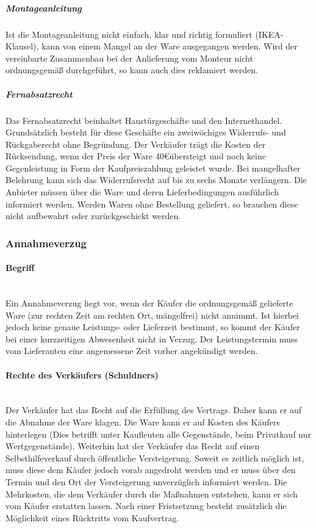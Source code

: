 \subparagraph{Montageanleitung} Ist die Montageanleitung nicht einfach, klar und richtig formuliert (IKEA-Klausel), kann von einem Mangel an der Ware ausgegangen werden. Wird der vereinbarte Zusammenbau bei der Anlieferung vom Monteur nicht ordnungsgemäß durchgeführt, so kann auch dies reklamiert werden.

\subparagraph{Fernabsatzrecht} Das Fernabsatzrecht beinhaltet Haustürgeschäfte und den Internethandel. Grundsätzlich besteht für diese Geschäfte ein zweiwöchiges Widerrufs- und Rückgaberecht ohne Begründung. Der Verkäufer trägt die Kosten der Rücksendung, wenn der Preis der Ware 40\euro übersteigt und noch keine Gegenleistung in Form der Kaufpreiszahlung geleistet wurde. Bei mangelhafter Belehrung kann sich das Widerrufsrecht auf bis zu sechs Monate verlängern. Die Anbieter müssen über die Ware und deren Lieferbedingungen ausführlich informiert werden. Werden Waren ohne Bestellung geliefert, so brauchen diese nicht aufbewahrt oder zurückgeschickt werden. 
		
		
\subsubsection{Annahmeverzug}

\paragraph{Begriff}~\\
Ein Annahmeverzug liegt vor, wenn der Käufer die ordnungsgemäß gelieferte Ware (zur rechten Zeit am rechten Ort, mängelfrei) nicht annimmt. Ist hierbei jedoch keine genaue Leistungs- oder Lieferzeit bestimmt, so kommt der Käufer bei einer kurzzeitigen Abwesenheit nicht in Verzug. Der Leistungstermin muss vom Lieferanten eine angemessene Zeit vorher angekündigt werden.

\paragraph{Rechte des Verkäufers (Schuldners)}~\\
Der Verkäufer hat das Recht auf die Erfüllung des Vertrags. Daher kann er auf die Abnahme der Ware klagen. Die Ware kann er auf Kosten des Käufers hinterlegen (Dies betrifft unter Kaufleuten alle Gegenstände, beim Privatkauf nur Wertgegenstände). Weiterhin hat der Verkäufer das Recht auf einen Selbsthilfeverkauf durch öffentliche Versteigerung. Soweit es zeitlich möglich ist, muss diese dem Käufer jedoch vorab angedroht werden und er muss über den Termin und den Ort der Versteigerung unverzüglich informiert werden. Die Mehrkosten, die dem Verkäufer durch die Maßnahmen entstehen, kann er sich vom Käufer erstatten lassen. Nach einer Fristsetzung besteht zusätzlich die Möglichkeit eines Rücktritts vom Kaufvertrag.

